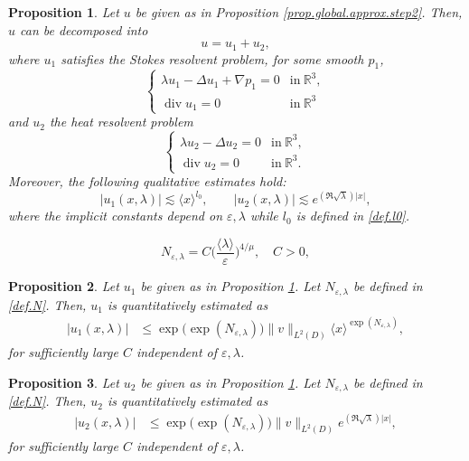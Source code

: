 \documentclass[10pt,a4paper]{amsart}
\newtheorem{proposition}{Proposition}
\newcommand{\R}{\mathbb{R}}
\newcommand{\eps}{\varepsilon}
\newcommand{\opdiv}{\operatorname{div}}
\begin{document}
\begin{proposition}\label{prop.global.approx.step3}
Let $u$ be given as in Proposition \ref{prop.global.approx.step2}. Then, $u$ can be decomposed into 
\[
    u = u_1 + u_2, 
\]
where $u_1$ satisfies the Stokes resolvent problem, for some smooth $p_1$, 
\[
    \left\{
    \begin{array}{ll}
    \lambda u_1 - \Delta u_1 + \nabla p_1
    = 0&\mbox{in}\ \R^3, \\
    \opdiv u_1
    = 0&\mbox{in}\ \R^3 
    \end{array}\right.
\]
and $u_2$ the heat resolvent problem 
\[
    \left\{
    \begin{array}{ll}
    \lambda u_2 - \Delta u_2 
    = 0&\mbox{in}\ \R^3, \\
    \opdiv u_2
    = 0&\mbox{in}\ \R^3.
    \end{array}\right.
\]
Moreover, the following qualitative estimates hold: 
\begin{equation}\label{est.u1u2.qual}
    |u_1(x,\lambda)| 
    \lesssim
    \langle x \rangle^{l_0}, 
    \qquad
    |u_2(x,\lambda)| 
    \lesssim
    e^{(\Re\sqrt{\lambda}) |x|}, 
\end{equation}
where the implicit constants depend on $\eps, \lambda$ while $l_0$ is defined in \eqref{def.l0}.
\end{proposition}

\begin{equation}\label{def.N}
    N_{\eps,\lambda}
    = 
    C
    \Big(\frac{\langle \lambda \rangle}{\eps} \Big)^{4/\mu},
    \quad
    C>0,
\end{equation}

\begin{proposition}\label{prop.global.approx.step4}
Let $u_1$ be given as in Proposition \ref{prop.global.approx.step3}. Let $N_{\eps, \lambda}$ be defined in \eqref{def.N}. Then, $u_1$ is quantitatively estimated as 
\begin{equation}\label{est.u1}
\begin{split}
    |u_1(x,\lambda)|
    &\le
    \exp\big(\exp(N_{\eps,\lambda})\big)
    \|v\|_{L^2(D)} 
    \langle x \rangle^{\exp (N_{\eps,\lambda})}, 
\end{split}
\end{equation}
for sufficiently large $C$ independent of $\eps, \lambda$. 
\end{proposition}

\begin{proposition}\label{prop.global.approx.step5}
Let $u_2$ be given as in Proposition \ref{prop.global.approx.step3}. Let $N_{\eps, \lambda}$ be defined in \eqref{def.N}. Then, $u_2$ is quantitatively estimated as 
\begin{equation}\label{est.u2}
\begin{split}
    |u_2(x,\lambda)|
    &\le 
    \exp\big(\exp(N_{\eps,\lambda})\big) 
    \|v\|_{L^2(D)} 
    e^{(\Re\sqrt{\lambda})|x|}, 
\end{split} 
\end{equation}
for sufficiently large $C$ independent of $\eps, \lambda$. 
\end{proposition}
\end{document}
